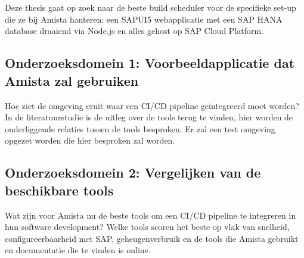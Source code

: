 
\chapter{}
\label{ch:methodologie}

Deze thesis gaat op zoek naar de beste build scheduler voor de specifieke set-up die ze bij Amista hanteren: een SAPUI5 webapplicatie met een SAP HANA database draaiend via Node.js en alles gehost op SAP Cloud Platform.



\section{Onderzoeksdomein 1: Voorbeeldapplicatie dat Amista zal gebruiken}
\label{sec:onderzoeksdeel1}
Hoe ziet de omgeving eruit waar een CI/CD pipeline geïntegreerd moet worden? In de literatuurstudie is de uitleg over de tools terug te vinden, hier worden de onderliggende relaties tussen de tools besproken.
Er zal een test omgeving opgezet worden die hier besproken zal worden. 


\section{Onderzoeksdomein 2: Vergelijken van de beschikbare tools}
\label{sec:onderzoeksdeel2}
Wat zijn voor Amista nu de beste tools om een CI/CD pipeline te integreren in hun software development? Welke tools scoren het beste op vlak van snelheid, configureerbaarheid met SAP, geheugenverbruik en de tools die Amista gebruikt en documentatie die te vinden is online.